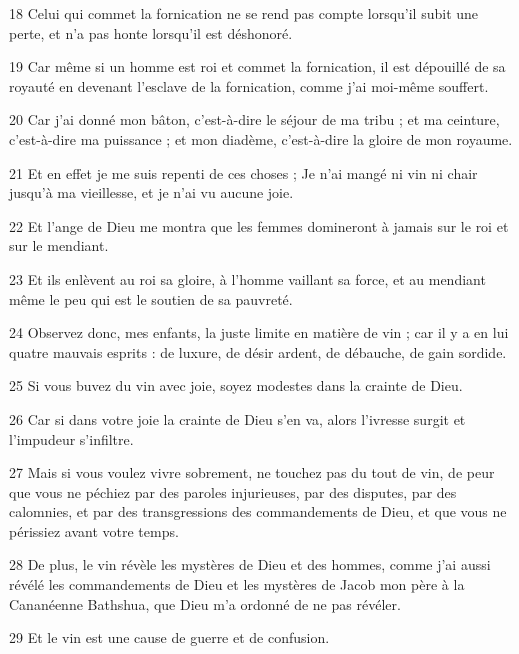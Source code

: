 \par 18 Celui qui commet la fornication ne se rend pas compte lorsqu'il subit une perte, et n'a pas honte lorsqu'il est déshonoré.

\par 19 Car même si un homme est roi et commet la fornication, il est dépouillé de sa royauté en devenant l'esclave de la fornication, comme j'ai moi-même souffert.

\par 20 Car j'ai donné mon bâton, c'est-à-dire le séjour de ma tribu ; et ma ceinture, c'est-à-dire ma puissance ; et mon diadème, c'est-à-dire la gloire de mon royaume.

\par 21 Et en effet je me suis repenti de ces choses ; Je n'ai mangé ni vin ni chair jusqu'à ma vieillesse, et je n'ai vu aucune joie.

\par 22 Et l'ange de Dieu me montra que les femmes domineront à jamais sur le roi et sur le mendiant.

\par 23 Et ils enlèvent au roi sa gloire, à l'homme vaillant sa force, et au mendiant même le peu qui est le soutien de sa pauvreté.

\par 24 Observez donc, mes enfants, la juste limite en matière de vin ; car il y a en lui quatre mauvais esprits : de luxure, de désir ardent, de débauche, de gain sordide.

\par 25 Si vous buvez du vin avec joie, soyez modestes dans la crainte de Dieu.

\par 26 Car si dans votre joie la crainte de Dieu s'en va, alors l'ivresse surgit et l'impudeur s'infiltre.

\par 27 Mais si vous voulez vivre sobrement, ne touchez pas du tout de vin, de peur que vous ne péchiez par des paroles injurieuses, par des disputes, par des calomnies, et par des transgressions des commandements de Dieu, et que vous ne périssiez avant votre temps.

\par 28 De plus, le vin révèle les mystères de Dieu et des hommes, comme j'ai aussi révélé les commandements de Dieu et les mystères de Jacob mon père à la Cananéenne Bathshua, que Dieu m'a ordonné de ne pas révéler.

\par 29 Et le vin est une cause de guerre et de confusion.

